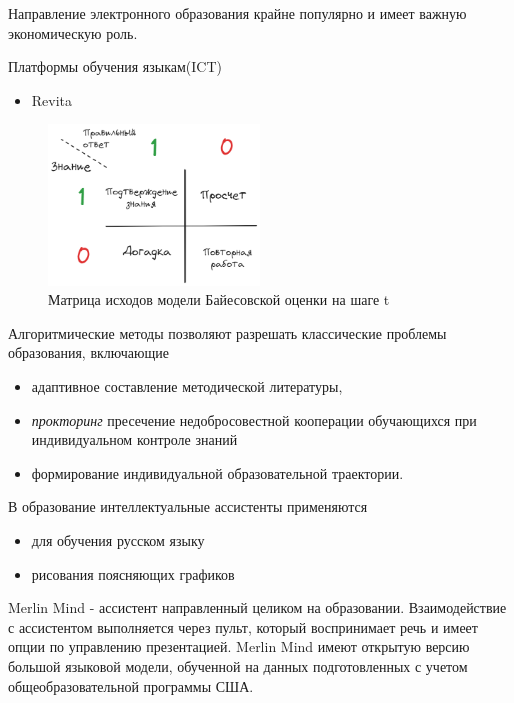 Направление электронного образования крайне популярно и имеет важную экономическую роль.


Платформы обучения языкам(ICT) \begin{itemize}
    \item Revita \cite{katinskaia2018revita}
\end{itemize}


\begin{figure}[h]
    \centering
    \includegraphics[width=0.5\textwidth]{assets/work/rating/bkt.excalidraw.png}
    \caption{Матрица исходов модели Байесовской оценки на шаге t}
    \label{bkt}
\end{figure}


Алгоритмические методы позволяют разрешать классические проблемы образования, включающие \begin{itemize}
    \item адаптивное составление методической литературы,
    \item \textit{прокторинг} пресечение недобросовестной кооперации обучающихся при  индивидуальном контроле знаний 
    \item формирование индивидуальной образовательной траектории.
\end{itemize}

В образование интеллектуальные ассистенты применяются \begin{itemize}
    \item  для обучения русском языку \cite{аль2019интеллектуальный}
    \item рисования поясняющих графиков \cite{bulusuautomated}
\end{itemize}



Merlin Mind - ассистент направленный целиком на образовании. Взаимодействие с ассистентом выполняется через пульт, который воспринимает речь и имеет опции по управлению презентацией.
Merlin Mind имеют открытую версию большой языковой модели, обученной на данных подготовленных с учетом общеобразовательной программы США.
